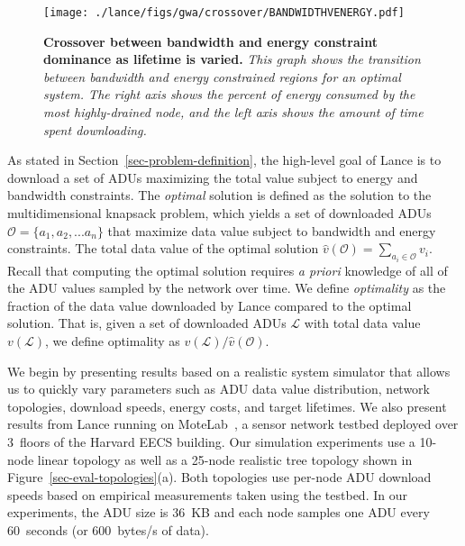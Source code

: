 \begin{figure}[t]
\begin{center}
\texttt{[image: ./lance/figs/gwa/crossover/BANDWIDTHVENERGY.pdf]}
\end{center}
\caption{\small {\bf Crossover between bandwidth and energy constraint
dominance as lifetime is varied.} 
{\em This graph shows the transition between bandwidth and energy constrained
regions for an optimal system.  The right axis shows the percent of energy
consumed by the most highly-drained node, and the left axis shows the amount
of time spent downloading.}}
\label{sec-eval-crossover}
\end{figure}



As stated in Section~\ref{sec-problem-definition}, the high-level goal of
Lance is to download a set of ADUs maximizing the total value subject to
energy and bandwidth constraints. The {\em optimal} solution is
defined as the solution to the multidimensional knapsack problem,
which yields a set of downloaded ADUs $\mathcal{O} = \{a_1, a_2, ...
a_n\}$ that maximize data value subject to bandwidth and energy
constraints. The total data value of the optimal solution 
$\hat{v}(\mathcal{O}) = \sum_{a_i \in \mathcal{O}} v_i$.
Recall that computing the optimal solution requires {\em a priori} 
knowledge of all of the ADU values sampled by the network over time.
We define {\em optimality} as the fraction of the data value 
downloaded by Lance compared to the optimal solution. That is, given
a set of downloaded ADUs $\mathcal{L}$ with total data value
$v(\mathcal{L})$, we define optimality as 
$v(\mathcal{L}) / \hat{v}(\mathcal{O})$.


We begin by presenting results based on a realistic system
simulator that allows us to quickly vary parameters such as 
ADU data value distribution, network topologies, download speeds,
energy costs, and target lifetimes. We also present results from 
Lance running on MoteLab~\cite{motelab}, a sensor network testbed
deployed over 3~floors of the Harvard EECS building.
Our simulation experiments use
a 10-node linear topology as well as a 25-node realistic tree topology
shown in Figure~\ref{sec-eval-topologies}(a). Both
topologies use per-node ADU download speeds based on empirical 
measurements taken using the testbed. 
In our experiments, the ADU size is 36~KB and each node samples one 
ADU every 60~seconds (or 600~bytes/s of data).

